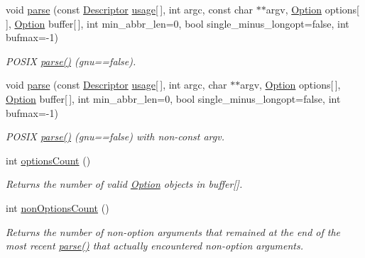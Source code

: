\begin{DoxyCompactItemize}
void \hyperlink{class_option_parser_1_1_parser_a8cf9bff7f638fb4c48569cd2ef38b78b}{parse} (const \hyperlink{struct_option_parser_1_1_descriptor}{Descriptor} \hyperlink{_selective_community_detection-_x_8cpp_ae4e685e845abde182eb8fc1f87b756ae}{usage}\mbox{[}$\,$\mbox{]}, int argc, const char $\ast$$\ast$argv, \hyperlink{class_option_parser_1_1_option}{Option} options\mbox{[}$\,$\mbox{]}, \hyperlink{class_option_parser_1_1_option}{Option} buffer\mbox{[}$\,$\mbox{]}, int min\-\_\-abbr\-\_\-len=0, bool single\-\_\-minus\-\_\-longopt=false, int bufmax=-\/1)
\begin{DoxyCompactList}\small\item\em P\-O\-S\-I\-X \hyperlink{class_option_parser_1_1_parser_adbde29c0025d0ec88f8b41a656ab45a1}{parse()} (gnu==false). \end{DoxyCompactList}\item 
void \hyperlink{class_option_parser_1_1_parser_a3a5ed99c44d5d02191bb48465036870b}{parse} (const \hyperlink{struct_option_parser_1_1_descriptor}{Descriptor} \hyperlink{_selective_community_detection-_x_8cpp_ae4e685e845abde182eb8fc1f87b756ae}{usage}\mbox{[}$\,$\mbox{]}, int argc, char $\ast$$\ast$argv, \hyperlink{class_option_parser_1_1_option}{Option} options\mbox{[}$\,$\mbox{]}, \hyperlink{class_option_parser_1_1_option}{Option} buffer\mbox{[}$\,$\mbox{]}, int min\-\_\-abbr\-\_\-len=0, bool single\-\_\-minus\-\_\-longopt=false, int bufmax=-\/1)
\begin{DoxyCompactList}\small\item\em P\-O\-S\-I\-X \hyperlink{class_option_parser_1_1_parser_adbde29c0025d0ec88f8b41a656ab45a1}{parse()} (gnu==false) with non-\/const argv. \end{DoxyCompactList}\item 
int \hyperlink{class_option_parser_1_1_parser_aa55e79ff2a3d08e449762aee76991222}{options\-Count} ()
\begin{DoxyCompactList}\small\item\em Returns the number of valid \hyperlink{class_option_parser_1_1_option}{Option} objects in {\ttfamily buffer}\mbox{[}\mbox{]}. \end{DoxyCompactList}\item 
int \hyperlink{class_option_parser_1_1_parser_a9cf3ea6206b3d832ef6cbc335e3b58e6}{non\-Options\-Count} ()
\begin{DoxyCompactList}\small\item\em Returns the number of non-\/option arguments that remained at the end of the most recent \hyperlink{class_option_parser_1_1_parser_adbde29c0025d0ec88f8b41a656ab45a1}{parse()} that actually encountered non-\/option arguments. \end{DoxyCompactList}\item 

\end{DoxyCompactItemize}
